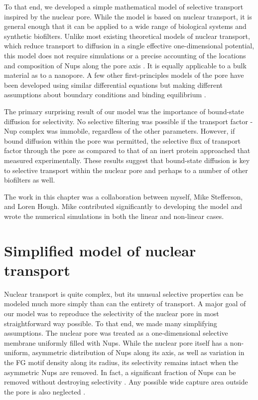 To that end, we developed a simple mathematical model of selective transport inspired by the nuclear pore.  While the model is based on nuclear transport, it is general enough that it can be applied to a wide range of biological systems and synthetic biofilters.  Unlike most existing theoretical models of nuclear transport, which reduce transport to diffusion in a single effective one-dimensional potential, this model does not require simulations or a precise accounting of the locations and composition of Nups along the pore axis \cite{pulupa17, vovk16,tagliazucchi13, tu13, timney16}.  It is equally applicable to a bulk material as to a nanopore.  A few other first-principles models of the pore have been developed using similar differential equations but making different assumptions about boundary conditions and binding equilibrium \cite{zilman07,yang18}.

The primary surprising result of our model was the importance of bound-state diffusion for selectivity.  No selective filtering was possible if the transport factor - Nup complex was immobile, regardless of the other parameters.  However, if bound diffusion within the pore was permitted, the selective flux of transport factor through the pore as compared to that of an inert protein approached that measured experimentally.  These results suggest that bound-state diffusion is key to selective transport within the nuclear pore and perhaps to a number of other biofilters as well.

The work in this chapter was a collaboration between myself, Mike Stefferson, and Loren Hough.  Mike contributed significantly to developing the model and wrote the numerical simulations in both the linear and non-linear cases.

\section{Simplified model of nuclear transport}
\label{sec:model}

Nuclear transport is quite complex, but its unusual selective properties can be modeled much more simply than can the entirety of transport.  A major goal of our model was to reproduce the selectivity of the nuclear pore in most straightforward way possible.  To that end, we made many simplifying assumptions.  The nuclear pore was treated as a one-dimensional selective membrane uniformly filled with Nups.  While the nuclear pore itself has a non-uniform, asymmetric distribution of Nups along its axis, as well as variation in the FG motif density along its radius, its selectivity remains intact when the asymmetric Nups are removed.  In fact, a significant fraction of Nups can be removed without destroying selectivity \cite{strawn04, zeitler04,kowalczyk11, jovanovic-talisman09}.  Any possible wide capture area outside the pore is also neglected \cite{pagliara14}.


